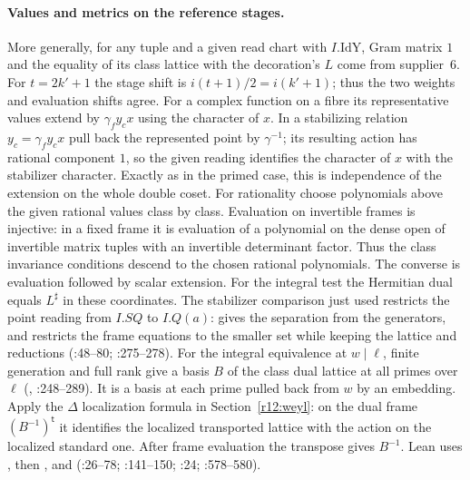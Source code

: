 \paragraph{Values and metrics on the reference stages.}
More generally, for any tuple and a given read chart with $I.\mathrm{IdY}$,
Gram matrix $1$ and the equality of its class lattice with the decoration's
$L$ come from supplier~6. For $t=2k'+1$ the stage shift is
$i(t+1)/2=i(k'+1)$; thus the two weights and evaluation shifts agree.
For a complex function on a fibre its representative values extend by
$\gamma_f y_c x$ using the character of $x$. In a stabilizing relation
$y_c=\gamma_f y_c x$ pull back the represented point by $\gamma^{-1}$;
its resulting action has rational component $1$, so the given reading
identifies the character of $x$ with the stabilizer character. Exactly
as in the primed case, this is independence of the extension on the
whole double coset. For rationality choose polynomials above the given
rational values class by class. Evaluation on invertible frames is
injective: in a fixed frame it is evaluation of a polynomial on the
dense open of invertible matrix tuples with an invertible determinant
factor. Thus the class invariance conditions descend to the chosen
rational polynomials. The converse is evaluation followed by scalar
extension. For the integral test the Hermitian dual equals $L^\sharp$
in these coordinates. The stabilizer comparison just used restricts the
point reading from $I.SQ$ to $I.Q(a)$: 
gives the separation from the generators, and 
restricts the frame equations to the smaller set while keeping the
lattice and reductions (:48--80;
:275--278).
For the integral equivalence at $w\mid\ell$, finite generation and
full rank give a basis $B$ of the class dual lattice at all primes
over $\ell$ (, :248--289).
It is a basis at each prime pulled back from $w$ by an embedding.
Apply the $\Delta$ localization formula in Section~\ref{r12:weyl}:
on the dual frame $(B^{-1})^{\mathsf t}$ it identifies the localized
transported lattice with the action on the localized standard one.
After frame evaluation the transpose gives $B^{-1}$.
Lean uses , then
,  and
(:26--78;
:141--150;
:24;
:578--580).
